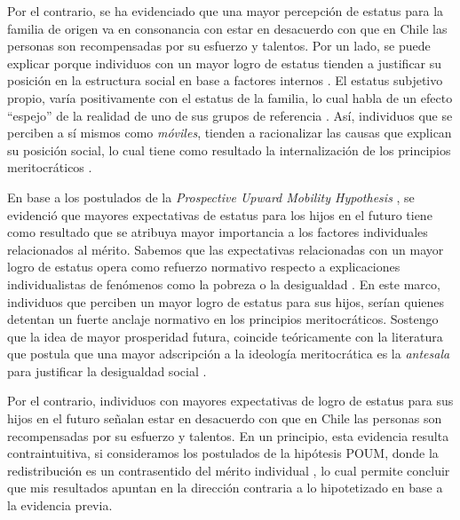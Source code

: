 \documentclass[12pt]{article}
\begin{document}
Por el contrario, se ha evidenciado que una mayor percepción de estatus para la familia de origen va en consonancia con estar en desacuerdo con que en Chile las personas son recompensadas por su esfuerzo y talentos. Por un lado, se puede explicar porque individuos con un mayor logro de estatus tienden a justificar su posición en la estructura social en base a factores internos \citep{Schneider2015}. El estatus subjetivo propio, varía positivamente con el estatus de la familia, lo cual habla de un efecto ``espejo'' de la realidad de uno de sus grupos de referencia \citep{Castillo2012, Castillo2013}. Así, individuos que se perciben a sí mismos como \emph{móviles}, tienden a racionalizar las causas que explican su posición social, lo cual tiene como resultado la internalización de los principios meritocráticos \citep{Kelley2009}.  


En base a los postulados de la \textit{Prospective Upward Mobility Hypothesis} \citep{Benabou2001, Alesina2005}, se evidenció que mayores expectativas de estatus para los hijos en el futuro tiene como resultado que se atribuya mayor importancia a los factores individuales relacionados al mérito. Sabemos que las expectativas relacionadas con un mayor logro de estatus opera como refuerzo normativo respecto a explicaciones individualistas de fenómenos como la pobreza o la desigualdad \citep{Landerretche2011, Gugushvili2016}. En este marco, individuos que perciben un mayor logro de estatus para sus hijos, serían quienes detentan un fuerte anclaje normativo en los principios meritocráticos. Sostengo que la idea de mayor prosperidad futura, coincide teóricamente con la literatura que postula que una mayor adscripción a la ideología meritocrática es la \textit{antesala} para justificar la desigualdad social \citep{Day2017}.

Por el contrario, individuos con mayores expectativas de logro de estatus para sus hijos en el futuro señalan estar en desacuerdo con que en Chile las personas son recompensadas por su esfuerzo y talentos. En un principio, esta evidencia resulta contraintuitiva, si consideramos los postulados de la hipótesis POUM, donde la redistribución es un contrasentido del mérito individual \citep{Jaime-Castillo2008}, lo cual permite concluir que mis resultados apuntan en la dirección contraria a lo hipotetizado en base a la evidencia previa. 
\end{document}
